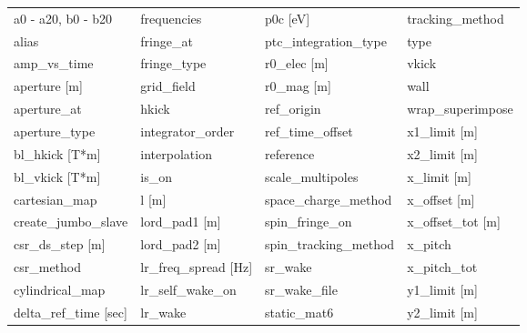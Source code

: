  \begin{tabular}{llll} \toprule
a0 - a20, b0 - b20               & frequencies                      & p0c [eV]                         & tracking_method                  \\
alias                            & fringe_at                        & ptc_integration_type             & type                             \\
amp_vs_time                      & fringe_type                      & r0_elec [m]                      & vkick                            \\
aperture [m]                     & grid_field                       & r0_mag [m]                       & wall                             \\
aperture_at                      & hkick                            & ref_origin                       & wrap_superimpose                 \\
aperture_type                    & integrator_order                 & ref_time_offset                  & x1_limit [m]                     \\
bl_hkick [T*m]                   & interpolation                    & reference                        & x2_limit [m]                     \\
bl_vkick [T*m]                   & is_on                            & scale_multipoles                 & x_limit [m]                      \\
cartesian_map                    & l [m]                            & space_charge_method              & x_offset [m]                     \\
create_jumbo_slave               & lord_pad1 [m]                    & spin_fringe_on                   & x_offset_tot [m]                 \\
csr_ds_step [m]                  & lord_pad2 [m]                    & spin_tracking_method             & x_pitch                          \\
csr_method                       & lr_freq_spread [Hz]              & sr_wake                          & x_pitch_tot                      \\
cylindrical_map                  & lr_self_wake_on                  & sr_wake_file                     & y1_limit [m]                     \\
delta_ref_time [sec]             & lr_wake                          & static_mat6                      & y2_limit [m]                     \\

\end{tabular}
